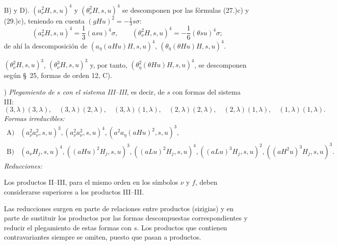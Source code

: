 \documentclass[11pt]{article}
\begin{document}
B) y D). $(a_\nu^2H,s,u)^4$ y $(\theta_\nu^2H,s,u)^4$ se descomponen por las fórmulas (27.)c) y (29.)c), teniendo en cuenta $(gHu)^2=-\frac13s\sigma$:
\[
(a_\nu^2H,s,u)^4=\frac13(asu)^4\sigma,
\qquad
(\theta_\nu^2H,s,u)^4=-\frac16(\theta su)^4\sigma;
\]
de ahí la descomposición de $(a_\eta(aHu)H,s,u)^4$, $(\theta_\eta(\theta Hu)H,s,u)^4$.

$(\theta_\nu^2H,s,u)^3$, $(\theta_\nu^3H,s,u)^3$ y, por tanto, $(\theta_\eta^2(\theta Hu)H,s,u)^4$, se descomponen según \S\ 25, formas de orden 12, C).

) \emph{Plegamiento de $s$ con el sistema III--III}, es decir, de $s$ con formas del sistema III:
\[
(3,\lambda)(3,\lambda),\quad (3,\lambda)(2,\lambda),\quad (3,\lambda)(1,\lambda),\quad
(2,\lambda)(2,\lambda),\quad (2,\lambda)(1,\lambda),\quad (1,\lambda)(1,\lambda).
\]
\noindent\emph{Formas irreducibles:}
\[
\begin{array}{rl}
\text{A)}&(a_\nu^2a_\nu^2,s,u)^3,
(a_\nu^2a_\nu^2,s,u)^4,
(a^2a_\eta(aHu)^2,s,u)^3,\\[0.3em]
\text{B)}&(a_\nu H_j,s,u)^4,
((aHu)^2H_j,s,u)^3,
((aLu)^2H_j,s,u)^4,
((aLu)^3H_j,s,u)^2,
((aH^2u)^3H_j,s,u)^3.
\end{array}
\]
\noindent\emph{Reducciones:}

Los productos II--III, para el mismo orden en los símbolos $\nu$ y $f$, deben considerarse superiores a los productos III--III.

Las reducciones surgen en parte de relaciones entre productos (sizigias) y en parte de sustituir los productos por las formas descompuestas correspondientes y reducir el plegamiento de estas formas con $s$. Los productos que contienen contravariantes siempre se omiten, puesto que pasan a productos.
\end{document}
